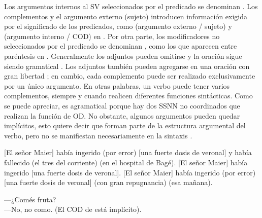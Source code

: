 Los argumentos internos al SV seleccionados por el predicado se denominan
. Los complementos y el argumento externo (sujeto)
introducen información exigida por el significado de los predicados, como
 (argumento externo / sujeto) y  (argumento interno / COD) en . Por otra parte, los
modificadores no seleccionados por el predicado se denominan
, como los que aparecen entre paréntesis en
. Generalmente los adjuntos pueden omitirse y la oración
sigue siendo gramatical . Los adjuntos también pueden
agregarse en una oración con gran libertad ; en cambio,
cada complemento puede ser realizado exclusivamente por un único argumento. En
otras palabras, un verbo puede tener varios complementos, siempre y cuando
realicen diferentes funciones sintácticas. Como se puede apreciar,
 es agramatical porque hay dos SSNN no coordinados que
realizan la función de OD. No obstante, algunos argumentos pueden quedar
implícitos, esto quiere decir que forman parte de la estructura argumental del
verbo, pero no se manifiestan necesariamente en la sintaxis
.

\begin{exe}
  \ex\label{ex:07-maier}
    \begin{xlist}
      \ex\label{ex:07-maier-a} {}[El señor Maier] había ingerido (por error) [una
          fuerte dosis de veronal] y había fallecido (el tres del corriente) (en
          el hospital de Bagé).
      \ex\label{ex:07-maier-b} {}[El señor Maier] había ingerido [una fuerte
          dosis de veronal].
      \ex\label{ex:07-maier-c} {}[El señor Maier] había ingerido (por error) [una
          fuerte dosis de veronal] (con gran repugnancia) (esa mañana).
    \end{xlist}
  \ex\label{ex:07-fruta} ---¿Comés fruta?\\
      ---No, no como. (El COD de  está implícito).
\end{exe}

